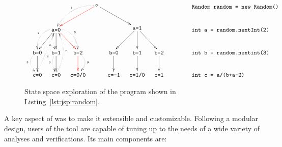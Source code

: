 \begin{figure}[t]
\centering
\[\xymatrix@C=1em{
	& & & \ar@[red][lld] \ar@/_1pc/@{.>}[lld]_{\txt{\tiny 1}} \circ \ar[rrd] & & & & \txt{\texttt{~~~~~~Random random = new Random()}} \\
	& \ar[ld] \ar@/_1pc/@{.>}[ld]_{\txt{\tiny 2}} \ar[d] \ar@/_/@{.>}[d]_(0.7){\txt{\tiny 5}} \txt{\texttt{a=0}} \ar@[red][rd] \ar@/^1pc/@{.>}[rd]^{\txt{\tiny 8}} & & & & 
	  \ar[ld] \ar[d] \texttt{a=1} \ar[rd] & & \txt{\texttt{~~~int a = random.nextInt(2)}} \\
	\ar[d] \ar@/_1pc/@{.>}[d]_{\txt{\tiny 3}} \txt{\texttt{b=0}} & 
	\ar[d] \ar@/_/@{.>}[d]_{\txt{\tiny 6}} \txt{\texttt{b=1}} & 
	\ar@[red][d] \ar@/^1pc/@{.>}[d]^{\txt{\tiny 9}} \txt{\texttt{b=2}} & & 
	\ar[d] \txt{\texttt{b=0}} & 
	\ar[d] \txt{\texttt{b=1}} & 
	\ar[d] \txt{\texttt{b=2}} & \txt{\texttt{~~~int b = random.nextint(3)}} \\
	\txt{\texttt{c=0}} \ar@{.>}[ruu]_(0.4){\txt{\tiny 4}} & 
	\ar@/_1pc/@{.>}[uu]_{\txt{\tiny 7}} \txt{\texttt{c=0}} & 
	\txt{\texttt{c=0/0}} & & 
	\txt{\texttt{c=-1}} & 
	\txt{\texttt{c=1/0}} & 
	\txt{\texttt{c=1}} & 
	\txt{\texttt{int c = a/(b+a-2)~~~~~~}}
} \]
\caption[State Space Exploration of an Example Program]{State space exploration of the program shown in Listing~\ref{lst:jsp:random}.}
\label{fig:jpf:random}
\end{figure}

A key aspect of \jpf{} was to make it extensible and customizable. Following a modular design, users of the tool are capable of tuning \jpf{} up to the needs of a wide variety of analyses and verifications. Its main components are:


